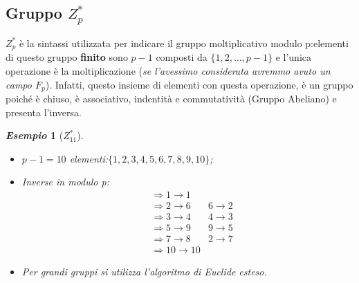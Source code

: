 \documentclass{book}
\newtheorem{esempio}{\emph{Esempio}}
\begin{document}
\subsection{Gruppo \(Z_{p}^{*}\)}
\(Z_{p}^{*}\) è la sintassi utilizzata per indicare il gruppo moltiplicativo modulo p:\@gli elementi di questo gruppo \textbf{finito} sono \(p-1\) composti da \( \{ 1,2,\ldots,p-1\} \) e l'unica operazione è la moltiplicazione (\emph{se l'avessimo considerata avremmo avuto un campo \(F_{p}\)})\@.\newline
Infatti, questo insieme di elementi con questa operazione, è un gruppo poiché è chiuso, è associativo, indentità e commutatività (Gruppo Abeliano) e presenta l'inversa\@.
\begin{esempio}[\(Z_{11}^{*}\)]
    \begin{itemize}
        \item \(p-1=10\) elementi:\( \{1,2,3,4,5,6,7,8,9,10 \} \);
        \item Inverse in modulo p:\begin{align*}
                   & \Rightarrow 1\rightarrow 1                        \\
                   & \Rightarrow 2\rightarrow 6\quad & 6 \rightarrow 2 \\
                   & \Rightarrow 3\rightarrow 4\quad & 4 \rightarrow 3 \\
                   & \Rightarrow 5\rightarrow 9\quad & 9 \rightarrow 5 \\
                   & \Rightarrow 7\rightarrow 8\quad & 2 \rightarrow 7 \\
                   & \Rightarrow 10\rightarrow 10
              \end{align*}
        \item Per grandi gruppi si utilizza l'algoritmo di Euclide esteso.
    \end{itemize}
\end{esempio}
\end{document}
